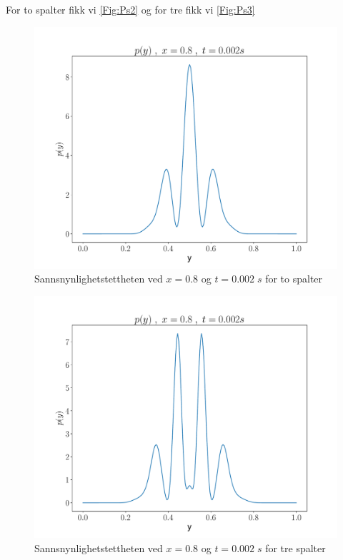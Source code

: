 \documentclass[reprint,english,notitlepage]{revtex4-2}  %
\begin{document}
For to spalter fikk vi \autoref{Fig:Ps2} og for tre fikk vi \autoref{Fig:Ps3}


\begin{figure}[H]
\centering
\includegraphics[scale=0.4]{../Images/ScreenProb2Slit.pdf}
\caption{Sannsnynlighetstettheten ved $x = 0.8$ og $t = 0.002 \; s$ for to spalter}
\label{Fig:Ps2}
\end{figure}


\begin{figure}[H]
\centering
\includegraphics[scale=0.4]{../Images/ScreenProb3Slit.pdf}
\caption{Sannsnynlighetstettheten ved $x = 0.8$ og $t = 0.002 \; s$ for tre spalter}
\label{Fig:Ps3}
\end{figure}
\end{document}
